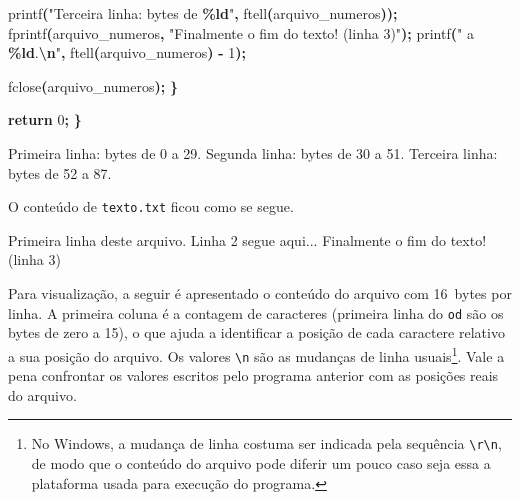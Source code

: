 \documentclass[
  11pt,
  a4paper,
]{scrbook}
\newenvironment{Shaded}{\begin{snugshade}}{\end{snugshade}}
\newcommand{\ControlFlowTok}[1]{\textcolor[rgb]{0.13,0.29,0.53}{\textbf{#1}}}
\newcommand{\DecValTok}[1]{\textcolor[rgb]{0.00,0.00,0.81}{#1}}
\newcommand{\NormalTok}[1]{#1}
\newcommand{\OperatorTok}[1]{\textcolor[rgb]{0.81,0.36,0.00}{\textbf{#1}}}
\newcommand{\SpecialCharTok}[1]{\textcolor[rgb]{0.81,0.36,0.00}{\textbf{#1}}}
\newcommand{\StringTok}[1]{\textcolor[rgb]{0.31,0.60,0.02}{#1}}
\begin{document}
\begin{Shaded}
\begin{Highlighting}[]
\NormalTok{        printf}\OperatorTok{(}\StringTok{"Terceira linha: bytes de }\SpecialCharTok{\%ld}\StringTok{"}\OperatorTok{,}\NormalTok{ ftell}\OperatorTok{(}\NormalTok{arquivo\_numeros}\OperatorTok{));}
\NormalTok{        fprintf}\OperatorTok{(}\NormalTok{arquivo\_numeros}\OperatorTok{,} \StringTok{"Finalmente o fim do texto! (linha 3)"}\OperatorTok{);}
\NormalTok{        printf}\OperatorTok{(}\StringTok{" a }\SpecialCharTok{\%ld}\StringTok{.}\SpecialCharTok{\textbackslash{}n}\StringTok{"}\OperatorTok{,}\NormalTok{ ftell}\OperatorTok{(}\NormalTok{arquivo\_numeros}\OperatorTok{)} \OperatorTok{{-}} \DecValTok{1}\OperatorTok{);}

\NormalTok{        fclose}\OperatorTok{(}\NormalTok{arquivo\_numeros}\OperatorTok{);}
    \OperatorTok{\}}

    \ControlFlowTok{return} \DecValTok{0}\OperatorTok{;}
\OperatorTok{\}}
\end{Highlighting}
\end{Shaded}

\begin{Shaded}
\begin{Highlighting}[]
\NormalTok{Primeira linha: bytes de 0 a 29.}
\NormalTok{Segunda linha: bytes de 30 a 51.}
\NormalTok{Terceira linha: bytes de 52 a 87.}
\end{Highlighting}
\end{Shaded}

O conteúdo de \texttt{texto.txt} ficou como se segue.

\begin{Shaded}
\begin{Highlighting}[]
\NormalTok{Primeira linha deste arquivo.}
\NormalTok{Linha 2 segue aqui...}
\NormalTok{Finalmente o fim do texto! (linha 3)}
\end{Highlighting}
\end{Shaded}

Para visualização, a seguir é apresentado o conteúdo do arquivo com
16~bytes por linha. A primeira coluna é a contagem de caracteres
(primeira linha do \texttt{od} são os bytes de zero a 15), o que ajuda a
identificar a posição de cada caractere relativo a sua posição do
arquivo. Os valores \texttt{\textbackslash{}n} são as mudanças de linha
usuais\footnote{No Windows, a mudança de linha costuma ser indicada pela
  sequência \texttt{\textbackslash{}r\textbackslash{}n}, de modo que o
  conteúdo do arquivo pode diferir um pouco caso seja essa a plataforma
  usada para execução do programa.}. Vale a pena confrontar os valores
escritos pelo programa anterior com as posições reais do arquivo.
\end{document}
